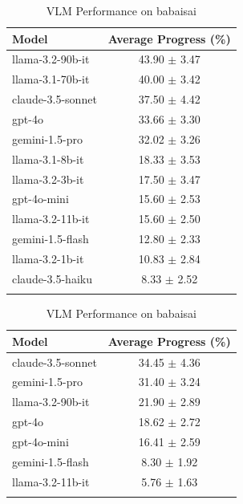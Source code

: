 \begin{table}[h]
    \centering
    \begin{minipage}[t]{0.48\linewidth}
    \centering
    \caption{LLM Performance on babaisai}
    \begin{tabular}{lc}
    \hline
    Model & Average Progress (\%) \\
    \hline
    llama-3.2-90b-it & 43.90 $\pm$ 3.47 \\
    llama-3.1-70b-it & 40.00 $\pm$ 3.42 \\
    claude-3.5-sonnet & 37.50 $\pm$ 4.42 \\
    gpt-4o & 33.66 $\pm$ 3.30 \\
    gemini-1.5-pro & 32.02 $\pm$ 3.26 \\
    llama-3.1-8b-it & 18.33 $\pm$ 3.53 \\
    llama-3.2-3b-it & 17.50 $\pm$ 3.47 \\
    gpt-4o-mini & 15.60 $\pm$ 2.53 \\
    llama-3.2-11b-it & 15.60 $\pm$ 2.50 \\
    gemini-1.5-flash & 12.80 $\pm$ 2.33 \\
    llama-3.2-1b-it & 10.83 $\pm$ 2.84 \\
    claude-3.5-haiku & 8.33 $\pm$ 2.52 \\
    \hline
    \label{babaisai_LLM}
    \end{tabular}
    \end{minipage}
    \hfill
    \begin{minipage}[t]{0.48\linewidth}
    \centering
    \caption{VLM Performance on babaisai}
    \begin{tabular}{lc}
    \hline
    Model & Average Progress (\%) \\
    \hline
    claude-3.5-sonnet & 34.45 $\pm$ 4.36 \\
    gemini-1.5-pro & 31.40 $\pm$ 3.24 \\
    llama-3.2-90b-it & 21.90 $\pm$ 2.89 \\
    gpt-4o & 18.62 $\pm$ 2.72 \\
    gpt-4o-mini & 16.41 $\pm$ 2.59 \\
    gemini-1.5-flash & 8.30 $\pm$ 1.92 \\
    llama-3.2-11b-it & 5.76 $\pm$ 1.63 \\
    \hline
    \label{babaisai_VLM}
    \end{tabular}
    \end{minipage}
\end{table}

